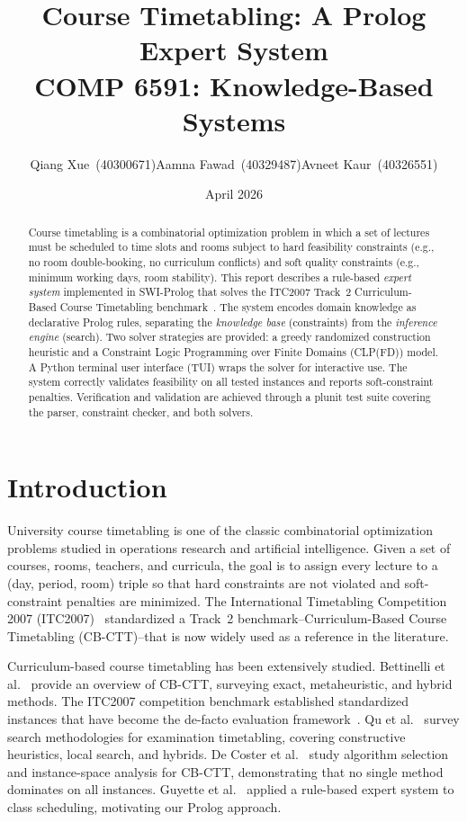 \documentclass[11pt,letterpaper]{article}
\title{\textbf{Course Timetabling: A Prolog Expert System} \\
  \large COMP 6591: Knowledge-Based Systems}
\author{Qiang Xue~(40300671)\quad Aamna Fawad~(40329487)\quad Avneet Kaur~(40326551)}
\date{April 2026}
\begin{document}
\maketitle
{\small
\tableofcontents
}
\newpage

\begin{abstract}
Course timetabling is a combinatorial optimization problem in which a set of lectures must be scheduled to time slots and rooms subject to hard feasibility constraints (e.g., no room double-booking, no curriculum conflicts) and soft quality constraints (e.g., minimum working days, room stability). This report describes a rule-based \textit{expert system} implemented in SWI-Prolog that solves the ITC2007 Track~2 Curriculum-Based Course Timetabling benchmark~\cite{itc2007}. The system encodes domain knowledge as declarative Prolog rules, separating the \emph{knowledge base} (constraints) from the \emph{inference engine} (search). Two solver strategies are provided: a greedy randomized construction heuristic and a Constraint Logic Programming over Finite Domains (CLP(FD)) model. A Python terminal user interface (TUI) wraps the solver for interactive use. The system correctly validates feasibility on all tested instances and reports soft-constraint penalties. Verification and validation are achieved through a plunit test suite covering the parser, constraint checker, and both solvers.
\end{abstract}

\section{Introduction}
University course timetabling is one of the classic combinatorial optimization problems studied in operations research and artificial intelligence. Given a set of courses, rooms, teachers, and curricula, the goal is to assign every lecture to a (day, period, room) triple so that hard constraints are not violated and soft-constraint penalties are minimized. The International Timetabling Competition 2007 (ITC2007)~\cite{itc2007} standardized a Track~2 benchmark--Curriculum-Based Course Timetabling (CB-CTT)--that is now widely used as a reference in the literature.

Curriculum-based course timetabling has been extensively studied. Bettinelli et al.~\cite{bettinelli2015overview} provide an overview of CB-CTT, surveying exact, metaheuristic, and hybrid methods. The ITC2007 competition benchmark established standardized instances that have become the de-facto evaluation framework~\cite{itc2007}. Qu et al.~\cite{qu2009survey} survey search methodologies for examination timetabling, covering constructive heuristics, local search, and hybrids. De Coster et al.~\cite{de2022algorithm} study algorithm selection and instance-space analysis for CB-CTT, demonstrating that no single method dominates on all instances. Guyette et al.~\cite{guyette1994rule} applied a rule-based expert system to class scheduling, motivating our Prolog approach.
\end{document}

